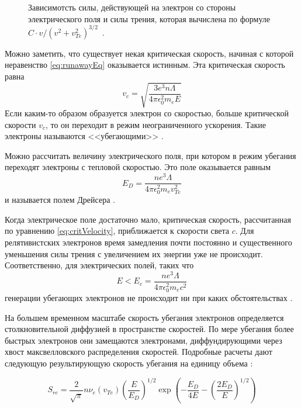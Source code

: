 \begin{figure}[ht]
  \caption{ Зависимотсть силы, действующей на электрон со стороны электрического поля и силы трения, которая вычислена по формуле $ C \cdot v/( v^2 + v_{Te}^2 )^{3/2} $~\cite{Golant1977}.}
  \label{fig:runawayForces}
\end{figure}

Можно заметить, что существует некая критическая скорость, начиная с которой неравенство \ref{eq:runawayEq} оказывается истинным. Эта критическая скорость равна
\begin{equation}
  \label{eq:critVelocity}
  v_c = \sqrt{ \frac{ 3 e^3 n \Lambda }{ 4 \pi \epsilon_0^2 m_e E } }
\end{equation}
Если каким-то образом образуется электрон со скоростью, больше критической скорости $v_c$, то он переходит в режим неограниченного ускорения. Такие электроны называются <<убегающими>> \cite{Golant1977}.

Можно рассчитать величину электрического поля, при котором в режим убегания переходят электроны с тепловой скоростью. Это поле оказывается равным 
\begin{equation*}
  E_D = \frac{ n e^3 \Lambda }{ 4 \pi \epsilon_0^2 m_e v_{Te}^2 }
\end{equation*}
и называется полем Дрейсера \cite{Dreicer1959,Golant1977,Wesson2004}. 

Когда электрическое поле достаточно мало, критическая скорость, рассчитанная по уравнению \ref{eq:critVelocity}, приближается к скорости света $c$. Для релятивистских электронов время замедления почти постоянно и существенного уменьшения силы трения с увеличением их энергии уже не происходит. Соответственно, для электрических полей, таких что
\begin{equation*}
  E < E_c = \frac{ n e^3 \Lambda }{ 4 \pi \epsilon_0^2 m_e c^2 }
\end{equation*}
генерации убегающих электронов не происходит ни при каких обстоятельствах \cite{Wesson2004}.

На большем временном масштабе скорость убегания электронов определяется столкновительной диффузией в пространстве скоростей. По мере убегания более быстрых электронов они замещаются электронами, диффундирующими через хвост максвелловского распределения скоростей. Подробные расчеты дают следующую результирующую скорость убегания на единицу объема \cite{Wesson2004}: 

\begin{equation*}
  S_{re} = \frac{2}{ \sqrt{\pi} } n \nu_{e}(v_{Te}) \left( \frac{E}{E_D} \right)^{1/2} \exp\left( -\frac{E_D}{4 E} - \left( \frac{2 E_D }{E} \right)^{1/2} \right)
\end{equation*}

